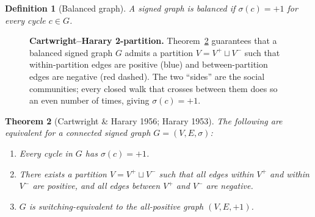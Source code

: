 \documentclass[11pt,a4paper]{article}
\newtheorem{theorem}{Theorem}[section]
\newtheorem{definition}[theorem]{Definition}
\theoremstyle{remark}
\begin{document}
\begin{definition}[Balanced graph]
A signed graph is \emph{balanced} if $\sigma(c) = +1$ for every
cycle $c \in G$.
\end{definition}

\begin{figure}[h]
\centering
{}
\caption{\textbf{Cartwright--Harary 2-partition.} Theorem~\ref{thm:cartwright-harary}
guarantees that a balanced signed graph $G$ admits a partition
$V = V^+ \sqcup V^-$ such that within-partition edges are positive
(blue) and between-partition edges are negative (red dashed). The
two ``sides'' are the social communities; every closed walk that
crosses between them does so an even number of times, giving
$\sigma(c) = +1$.}
\label{fig:cartwright-harary}
\end{figure}

\begin{theorem}[Cartwright \& Harary 1956; Harary 1953]\label{thm:cartwright-harary}
The following are equivalent for a connected signed graph
$G = (V, E, \sigma)$:
\begin{enumerate}[label=(\roman*)]
\item Every cycle in $G$ has $\sigma(c) = +1$.
\item There exists a partition $V = V^+ \sqcup V^-$ such that all
      edges within $V^+$ and within $V^-$ are positive, and all
      edges between $V^+$ and $V^-$ are negative.
\item $G$ is switching-equivalent to the all-positive graph
      $(V, E, +1)$.
\end{enumerate}
\end{theorem}
\end{document}
